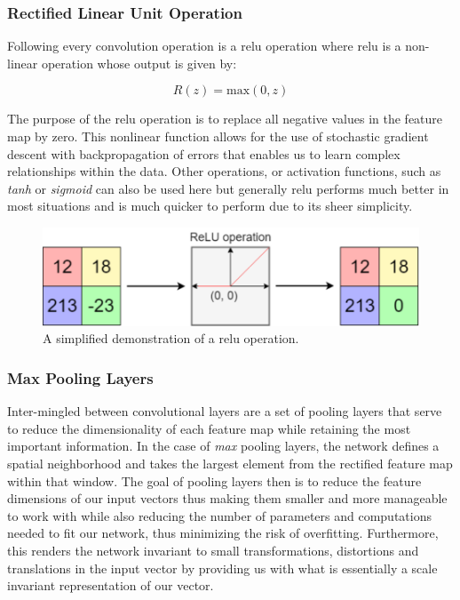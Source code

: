 \subsubsection{Rectified Linear Unit Operation}
\label{subsubsec:Background-Information:Forecasting-Models:Convolutional-Neural-Networks:ReLU}
Following every convolution operation is a \gls{relu} operation where \gls{relu} is a non-linear operation whose output is given by:

\begin{equation}
    R(z) = \text{max}(0, z)
\label{eq:ReLU}
\end{equation}

\noindent \newline The purpose of the \gls{relu} operation is to replace all negative values in the feature map by zero. This nonlinear function allows for the use of stochastic gradient descent with backpropagation of errors that enables us to learn complex relationships within the data.  Other operations, or activation functions, such as \textit{tanh} or \textit{sigmoid} can also be used here but generally \gls{relu} performs much better in most situations and is much quicker to perform due to its sheer simplicity.

\begin{figure}[hbt!]
    \centering
    \includegraphics[width=\textwidth]{Images/Chapter 3/CNN/ReLU-Illustration.pdf}
    \caption{A simplified demonstration of a \gls{relu} operation.}
    \label{fig:ReLU-Illustration}
\end{figure}

\subsubsection{Max Pooling Layers}
\label{subsubsec:Background-Information:Forecasting-Models:Convolutional-Neural-Networks:Max-Pooling-Layers}
Inter-mingled between convolutional layers are a set of pooling layers that serve to reduce the dimensionality of each feature map while retaining the most important information. In the case of \textit{max} pooling layers, the network defines a spatial neighborhood and takes the largest element from the rectified feature map within that window. The goal of pooling layers then is to reduce the feature dimensions of our input vectors thus making them smaller and more manageable to work with while also reducing the number of parameters and computations needed to fit our network, thus minimizing the risk of overfitting. Furthermore, this renders the network invariant to small transformations, distortions and translations in the input vector by providing us with what is essentially a scale invariant representation of our vector.

